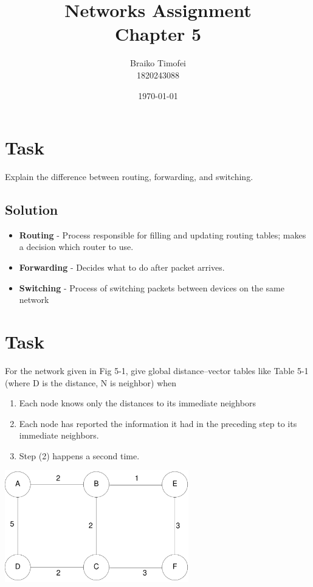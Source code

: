 \documentclass[11pt]{article}
\title{Networks Assignment\\ Chapter 5}
\author{Braiko Timofei\\1820243088}
\date{\today}
\begin{document}
    \section{Task}\label{sec:task-1}
    Explain the difference between routing, forwarding, and switching.

    \subsection{Solution}
    \begin{itemize}
        \item \textbf{Routing} - Process responsible for filling and updating routing tables;
        makes a decision which router to use.
        \item \textbf{Forwarding} - Decides what to do after packet arrives.
        \item \textbf{Switching} - Process of switching packets between devices on the same network
    \end{itemize}


    \newpage


    \section{Task}\label{sec:task-2}
    For the network given in Fig 5-1, give global distance–vector tables like Table 5-1 (where D is the
    distance, N is neighbor) when
    \begin{enumerate}
        \item Each node knows only the distances to its immediate neighbors
        \item Each node has reported the information it had in the preceding step to its immediate neighbors.
        \item Step (2) happens a second time.
    \end{enumerate}

    \begin{center}
        \includegraphics[width=0.6\textwidth]{figs/graph}
    \end{center}
\end{document}
